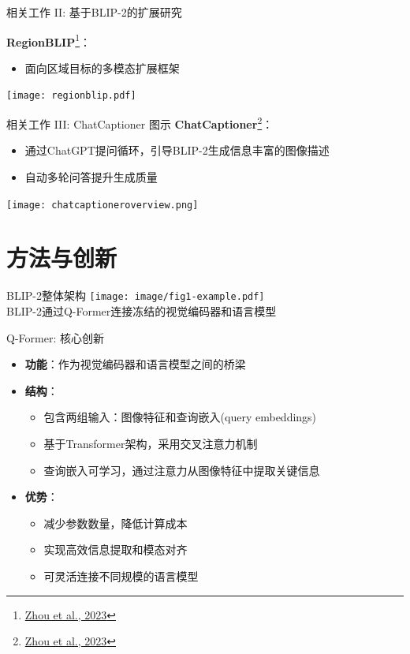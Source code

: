 \documentclass{beamer}
\begin{document}
\begin{frame}{相关工作 II: 基于BLIP-2的扩展研究}
    
\textbf{RegionBLIP}\footnote{\href{https://arxiv.org/abs/2308.02299}{Zhou et al., 2023}}：
  \begin{itemize}
    \item 面向区域目标的多模态扩展框架
  \end{itemize}
  \texttt{[image: regionblip.pdf]}
\end{frame}

\begin{frame}{相关工作 III: ChatCaptioner 图示}
  \textbf{ChatCaptioner}\footnote{\href{https://arxiv.org/abs/2303.06594}{Zhou et al., 2023}}：
  \begin{itemize}
    \item 通过ChatGPT提问循环，引导BLIP-2生成信息丰富的图像描述
    \item 自动多轮问答提升生成质量
  \end{itemize}
  \texttt{[image: chatcaptioneroverview.png]}
\end{frame}

\section{方法与创新}
\begin{frame}{BLIP-2整体架构}
  \centering
  \texttt{[image: image/fig1-example.pdf]}
  \vspace{0.3cm}
  \\
  \small{BLIP-2通过Q-Former连接冻结的视觉编码器和语言模型}
\end{frame}

\begin{frame}{Q-Former: 核心创新}
  \begin{itemize}
    \item \textbf{功能}：作为视觉编码器和语言模型之间的桥梁
    \item \textbf{结构}：
      \begin{itemize}
        \item 包含两组输入：图像特征和查询嵌入(query embeddings)
        \item 基于Transformer架构，采用交叉注意力机制
        \item 查询嵌入可学习，通过注意力从图像特征中提取关键信息
      \end{itemize}
    \item \textbf{优势}：
      \begin{itemize}
        \item 减少参数数量，降低计算成本
        \item 实现高效信息提取和模态对齐
        \item 可灵活连接不同规模的语言模型
      \end{itemize}
  \end{itemize}
\end{frame}
\end{document}
